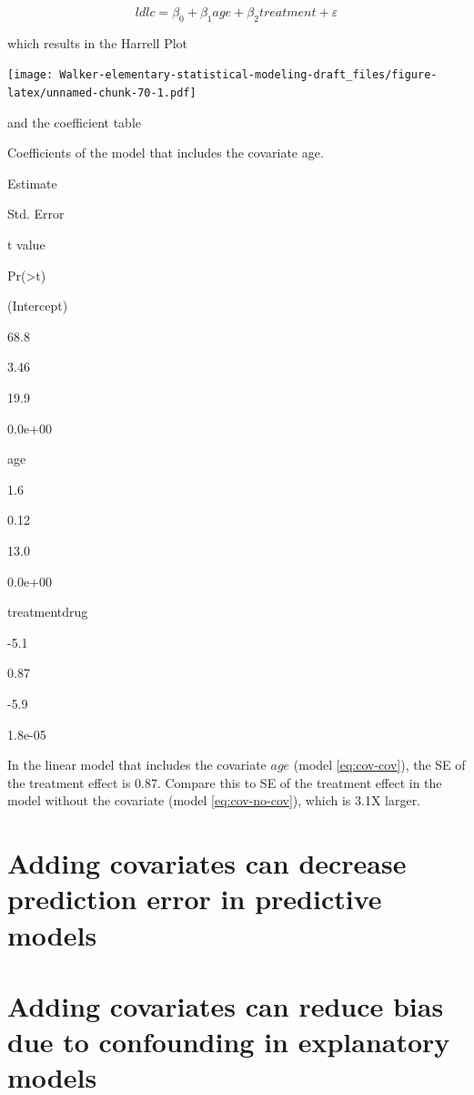 \documentclass[]{book}
\begin{document}
\begin{equation}
ldlc = \beta_0 + \beta_1 age + \beta_2 treatment + \varepsilon
\label{eq:cov-cov}
\end{equation}

which results in the Harrell Plot

\texttt{[image: Walker-elementary-statistical-modeling-draft\_files/figure-latex/unnamed-chunk-70-1.pdf]}

and the coefficient table

\label{tab:unnamed-chunk-71}Coefficients of the model that includes the
covariate age.

Estimate

Std. Error

t value

Pr(\textgreater{}\textbar{}t\textbar{})

(Intercept)

68.8

3.46

19.9

0.0e+00

age

1.6

0.12

13.0

0.0e+00

treatmentdrug

-5.1

0.87

-5.9

1.8e-05

In the linear model that includes the covariate \(age\) (model
\eqref{eq:cov-cov}), the SE of the treatment effect is 0.87. Compare this
to SE of the treatment effect in the model without the covariate (model
\eqref{eq:cov-no-cov}), which is 3.1X larger.

\section{Adding covariates can decrease prediction error in predictive
models}\label{adding-covariates-can-decrease-prediction-error-in-predictive-models}

\section{Adding covariates can reduce bias due to confounding in
explanatory
models}\label{adding-covariates-can-reduce-bias-due-to-confounding-in-explanatory-models}
\end{document}
